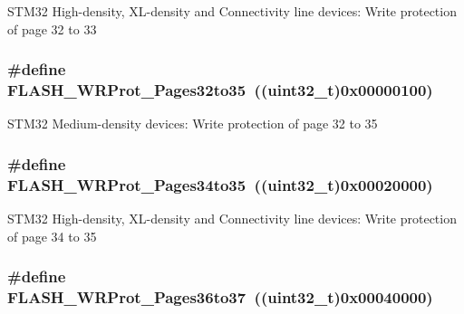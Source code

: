 STM32 High-\/density, XL-\/density and Connectivity line devices: Write protection of page 32 to 33 \hypertarget{group__Option__Bytes__Write__Protection_ga81a4250850e5fe7c251365cc22839a96}{
\subsubsection[{FLASH\_\-WRProt\_\-Pages32to35}]{\setlength{\rightskip}{0pt plus 5cm}\#define FLASH\_\-WRProt\_\-Pages32to35~((uint32\_\-t)0x00000100)}}
\label{group__Option__Bytes__Write__Protection_ga81a4250850e5fe7c251365cc22839a96}
STM32 Medium-\/density devices: Write protection of page 32 to 35 \hypertarget{group__Option__Bytes__Write__Protection_gaa5fee32ae0631b81413414f8e716868b}{
\subsubsection[{FLASH\_\-WRProt\_\-Pages34to35}]{\setlength{\rightskip}{0pt plus 5cm}\#define FLASH\_\-WRProt\_\-Pages34to35~((uint32\_\-t)0x00020000)}}
\label{group__Option__Bytes__Write__Protection_gaa5fee32ae0631b81413414f8e716868b}
STM32 High-\/density, XL-\/density and Connectivity line devices: Write protection of page 34 to 35 \hypertarget{group__Option__Bytes__Write__Protection_gab00dc29c0f12afd25cdb21b6d187ccc9}{
\subsubsection[{FLASH\_\-WRProt\_\-Pages36to37}]{\setlength{\rightskip}{0pt plus 5cm}\#define FLASH\_\-WRProt\_\-Pages36to37~((uint32\_\-t)0x00040000)}}
\label{group__Option__Bytes__Write__Protection_gab00dc29c0f12afd25cdb21b6d187ccc9}
